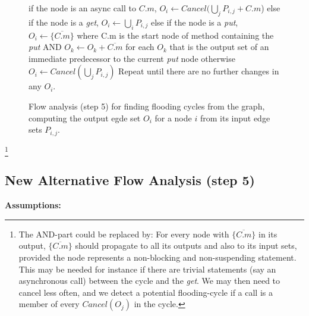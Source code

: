 \documentclass[12pt]{article}%
\begin{document}
\begin{figure}
\begin{shaded}
if the node is an async call to $C.m$, $O_i \leftarrow Cancel(\bigcup_j P_{i,j} + C.m$)\newline
else if the node is a \emph{get}, $O_i \leftarrow \bigcup_i P_{i,j}$\newline
else if the node is a \emph{put}, \newline
\hspace*{.5cm}  $O_i \leftarrow \{ \overline{C.m} \}$ where C.m is the start node of method containing the \emph{put}\newline
AND $O_k \leftarrow O_k + \overline{C.m}$ for each $O_k$ that is the output set of an immediate predecessor to the current \emph{put} node\newline
otherwise $O_i \leftarrow Cancel(\bigcup_j P_{i,j})$\newline
Repeat until there are no further changes in any $O_i$.%
\end{shaded}%
\caption{\label{step5}%
Flow analysis (step 5) for finding flooding cycles from the graph,
computing the output egde set $O_i$ for a node $i$ from its input edge sets 
$P_{i,j}$.
}
\end{figure}
\footnote{The AND-part could be replaced by:
For every node with $\{ \overline{C.m} \}$ in its output,
$\{ \overline{C.m} \}$ should propagate to all its outputs and also to its input sets, 
provided the node represents a  non-blocking and non-suspending statement.
This may be needed for instance if there are 
trivial statements (say an asynchronous call)
between the cycle and the \emph{get}.
We may then need to cancel less often,
and we detect a potential flooding-cycle if a call
is a member of every  $Cancel(O_j)$ in the cycle.
}

\subsection{New Alternative Flow Analysis (step 5)}

\textbf{Assumptions:}
\end{document}
